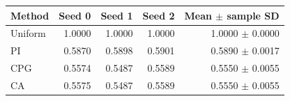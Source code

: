 \begin{tabular}{lrrrr}
\toprule
Method & Seed 0 & Seed 1 & Seed 2 & Mean $\pm$ sample SD \\
\midrule
Uniform & 1.0000 & 1.0000 & 1.0000 & 1.0000 $\pm$ 0.0000 \\
PI & 0.5870 & 0.5898 & 0.5901 & 0.5890 $\pm$ 0.0017 \\
CPG & 0.5574 & 0.5487 & 0.5589 & 0.5550 $\pm$ 0.0055 \\
CA & 0.5575 & 0.5487 & 0.5589 & 0.5550 $\pm$ 0.0055 \\
\bottomrule
\end{tabular}
